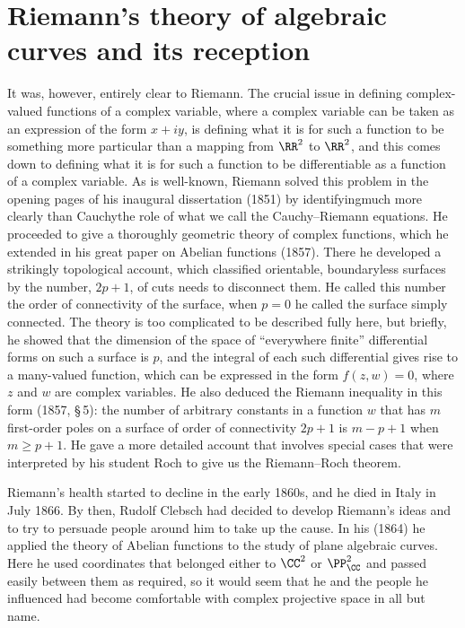 \section{Riemann's theory of algebraic curves and its reception}
It was, however, entirely clear to Riemann. The crucial issue in defining
com\-plex-valued functions of a complex variable, where a complex
variable
%
can be taken as an expression of the form $x+ iy$, is defining what it is
for such a function to be something more particular than a mapping from
$\RR^2$ to $\RR^2$, and this comes down to defining what it is for such
a function to be differentiable as a function of a complex variable. As
is well-known, Riemann
%
%
solved this problem in the opening pages of
his inaugural dissertation  (1851) by identifying\emdash much more
clearly than Cauchy\emdash the role of what we call the Cauchy--Riemann
equations. He proceeded to give a thoroughly geometric theory of complex
functions, which he extended in his great paper on Abelian functions
%
(1857). There he developed a strikingly topological account, which
classified orientable, boundaryless surfaces by the number, $2p+1$,
of cuts needs to disconnect them. He called this number the order of
connectivity of the surface, when $p=0$ he called the surface simply
connected. The theory is too complicated to be described fully here,
but briefly, he showed that  the dimension of the space of ``everywhere
finite'' differential forms
%
on such a surface is $p$, and the integral
of each such
differential gives rise to a many-valued function, which can be expressed
in the form $f(z, w) = 0$, where $z$ and $w$ are complex variables. He
also deduced the Riemann inequality
%
in this form (1857, \S\,5):  the
number of arbitrary constants in a function $w$ that has $m$ first-order
poles on a surface of order of connectivity $2p+1$ is $m- p + 1$ when $m
\geq p + 1$. He gave a more detailed account that involves special cases
%
that were interpreted by his student Roch to give us the Riemann--Roch
theorem.
%

Riemann's health started to decline in the early 1860s, and he  died
in Italy in July 1866. By then, Rudolf Clebsch had
%
decided to develop
Riemann's ideas and to try to persuade people around him to take up the
cause. In his (1864) he  applied the theory of Abelian functions to the
study of plane algebraic curves. Here he used coordinates that belonged
either to $\CC^2$ or $\PP_{\CC}^2$ and  passed easily between them as
required, so it would seem that he and the people he influenced had
become comfortable with complex projective space in all but name.


